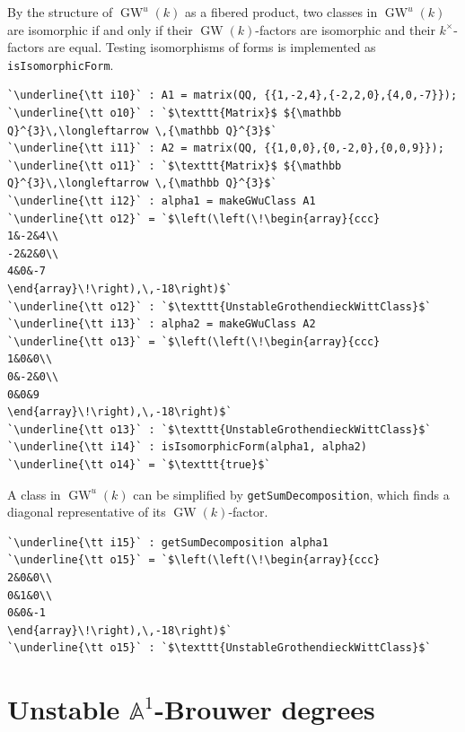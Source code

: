 \documentclass[12pt]{amsart}
\theoremstyle{definition}
\DeclareMathOperator{\GW}{GW}
\begin{document}
By the structure of $\GW^{u}(k)$ as a fibered product, two classes in $\GW^{u}(k)$ are isomorphic if and only if their $\GW(k)$-factors are isomorphic and their $k^{\times}$-factors are equal. Testing isomorphisms of forms is implemented as \texttt{isIsomorphicForm}. 
\begin{lstlisting}[language=Macaulay2output]
`\underline{\tt i10}` : A1 = matrix(QQ, {{1,-2,4},{-2,2,0},{4,0,-7}});
`\underline{\tt o10}` : `$\texttt{Matrix}$ ${\mathbb Q}^{3}\,\longleftarrow \,{\mathbb Q}^{3}$`
`\underline{\tt i11}` : A2 = matrix(QQ, {{1,0,0},{0,-2,0},{0,0,9}});
`\underline{\tt o11}` : `$\texttt{Matrix}$ ${\mathbb Q}^{3}\,\longleftarrow \,{\mathbb Q}^{3}$`
`\underline{\tt i12}` : alpha1 = makeGWuClass A1
`\underline{\tt o12}` = `$\left(\left(\!\begin{array}{ccc}
1&-2&4\\
-2&2&0\\
4&0&-7
\end{array}\!\right),\,-18\right)$`
`\underline{\tt o12}` : `$\texttt{UnstableGrothendieckWittClass}$`
`\underline{\tt i13}` : alpha2 = makeGWuClass A2
`\underline{\tt o13}` = `$\left(\left(\!\begin{array}{ccc}
1&0&0\\
0&-2&0\\
0&0&9
\end{array}\!\right),\,-18\right)$`
`\underline{\tt o13}` : `$\texttt{UnstableGrothendieckWittClass}$`
`\underline{\tt i14}` : isIsomorphicForm(alpha1, alpha2)
`\underline{\tt o14}` = `$\texttt{true}$`
\end{lstlisting}
A class in $\GW^{u}(k)$ can be simplified by \texttt{getSumDecomposition}, which finds a diagonal representative of its $\GW(k)$-factor.
\begin{lstlisting}[language=Macaulay2output]
`\underline{\tt i15}` : getSumDecomposition alpha1
`\underline{\tt o15}` = `$\left(\left(\!\begin{array}{ccc}
2&0&0\\
0&1&0\\
0&0&-1
\end{array}\!\right),\,-18\right)$`
`\underline{\tt o15}` : `$\texttt{UnstableGrothendieckWittClass}$`
\end{lstlisting}

\section{Unstable \texorpdfstring{$\mathbb{A}^{1}$}{A\textonesuperior}-Brouwer degrees}\label{sec: unstable degrees}
\end{document}
